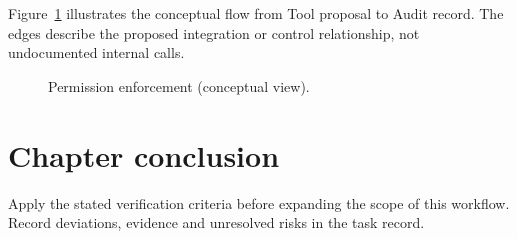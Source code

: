 Figure~\ref{fig:d20} illustrates the conceptual flow from Tool proposal to Audit record. The edges describe the proposed integration or control relationship, not undocumented internal calls.

\begin{figure}[htbp]\centering\caption{Permission enforcement (conceptual view).}\label{fig:d20}\end{figure}

\section{Chapter conclusion}

Apply the stated verification criteria before expanding the scope of this workflow. Record deviations, evidence and unresolved risks in the task record.
